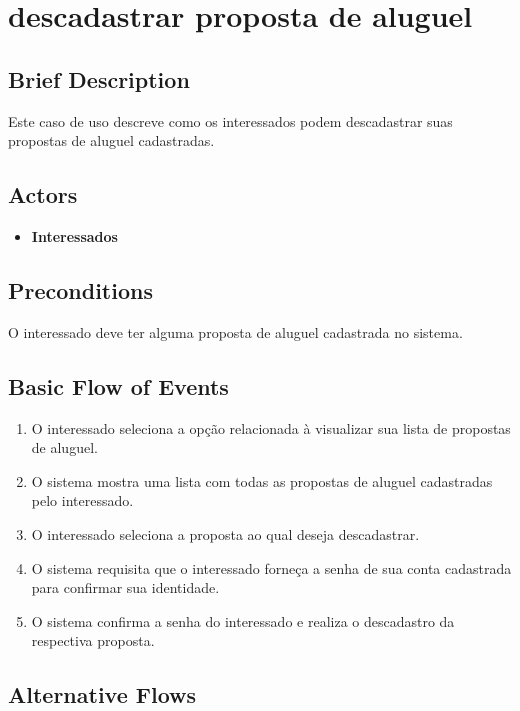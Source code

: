 \section{descadastrar proposta de aluguel}

\subsection*{Brief Description}
Este caso de uso descreve como os interessados podem descadastrar suas
propostas de aluguel cadastradas.

\subsection*{Actors}

\begin{itemize}
    \item \textbf{Interessados}
\end{itemize}

\subsection*{Preconditions}
O interessado deve ter alguma proposta de aluguel cadastrada no sistema.

\subsection*{Basic Flow of Events}

\begin{enumerate}
    \item  O interessado seleciona a opção relacionada à visualizar sua lista de propostas de aluguel.
    \item O sistema mostra uma lista com todas as propostas de aluguel cadastradas pelo
    interessado.
    \item O interessado seleciona a proposta ao qual deseja descadastrar.
    \item O sistema requisita que o interessado forneça a senha de sua conta cadastrada para
    confirmar sua identidade.
    \item O sistema confirma a senha do interessado e realiza o descadastro da respectiva
    proposta.
\end{enumerate}

\subsection*{Alternative Flows}

